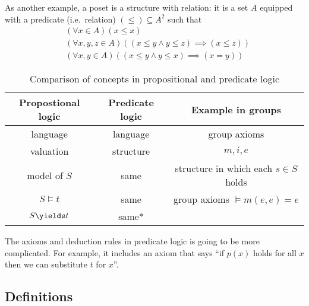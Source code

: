 \documentclass[a4paper]{article}
\begin{document}
As another example, a poset is a structure with relation: it is a set \(A\) equipped with a predicate (i.e.\ relation) \((\leq) \subseteq A^2\) such that
\begin{align*}
  & (\forall x \in A) (x \leq x) \\
  & (\forall x, y, z \in A) ((x \leq y \land y \leq z) \implies (x \leq z)) \\
  & (\forall x, y \in A) ((x \leq y \land y \leq x) \implies (x = y))
\end{align*}

\begin{table}[ht]
  \centering
  \begin{tabular}{|c|c|c|}
    \hline
    Propostional logic & Predicate logic & Example in groups \\ \hline
    language & language & group axioms \\ \hline
    valuation & structure & \(m, i, e\) \\ \hline
    model of \(S\) & same & structure in which each \(s \in S\) holds \\ \hline
    \(S \models t\) & same & group axioms \(\models m(e, e) = e\) \\ \hline
    \(S \yields t\) & same* & \\ \hline
  \end{tabular}
  \caption{Comparison of concepts in propositional and predicate logic}
\end{table}

The axioms and deduction rules in predicate logic is going to be more complicated. For example, it includes an axiom that says ``if \(p(x)\) holds for all \(x\) then we can substitute \(t\) for \(x\)''.

\subsection{Definitions}
\end{document}
